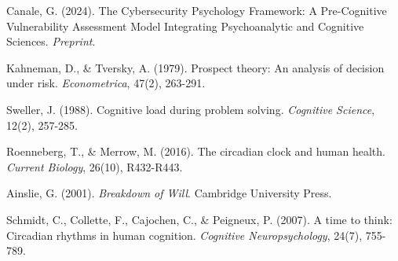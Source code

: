 \documentclass[11pt,a4paper]{article}
\begin{document}
\begin{thebibliography}{9}

Canale, G. (2024). The Cybersecurity Psychology Framework: A Pre-Cognitive Vulnerability Assessment Model Integrating Psychoanalytic and Cognitive Sciences. \textit{Preprint}.

Kahneman, D., \& Tversky, A. (1979). Prospect theory: An analysis of decision under risk. \textit{Econometrica}, 47(2), 263-291.

Sweller, J. (1988). Cognitive load during problem solving. \textit{Cognitive Science}, 12(2), 257-285.

Roenneberg, T., \& Merrow, M. (2016). The circadian clock and human health. \textit{Current Biology}, 26(10), R432-R443.

Ainslie, G. (2001). \textit{Breakdown of Will}. Cambridge University Press.

Schmidt, C., Collette, F., Cajochen, C., \& Peigneux, P. (2007). A time to think: Circadian rhythms in human cognition. \textit{Cognitive Neuropsychology}, 24(7), 755-789.

\end{thebibliography}
\end{document}
